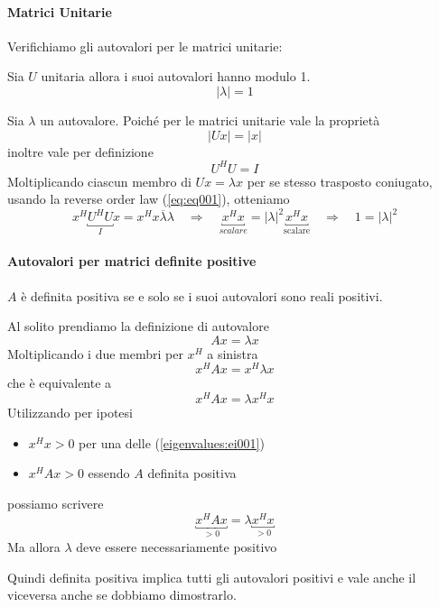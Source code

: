\paragraph{Matrici Unitarie}
Verifichiamo gli autovalori per le matrici unitarie:
\begin{property}
Sia $U$ unitaria allora i suoi autovalori hanno modulo 1.
 $$| \lambda | = 1 $$
\end{property}

\begin{thproof}
Sia $\lambda$ un autovalore. Poich\'e per le matrici unitarie vale la
propriet\`a
$$ |Ux| = |x|$$
inoltre vale per definizione
$$  U^{H} U = I$$
Moltiplicando ciascun membro di $Ux = \lambda x$ per se stesso trasposto
 coniugato, usando la reverse order law ({\ref{eq:eq001})}, otteniamo
$$ x^{H} \underbracket{U^{H} U}_{I}x = x^{H}x \overline{\lambda} \lambda 
\quad 
\Rightarrow 
 \quad \underbracket{x^{H}x}_{scalare} = |\lambda|^2 \underbracket{x^{H}x}_{\text{scalare}}  
 \quad \Rightarrow \quad  1 = | \lambda|^{2}$$
\end{thproof}


\paragraph{Autovalori per matrici definite positive}
\begin{property}
$A$ è definita positiva se e solo se
i suoi autovalori sono reali positivi.
\end{property}

\begin{thproof}
Al solito prendiamo la definizione di autovalore
$$ Ax = \lambda x$$
Moltiplicando i due membri per $x^{H}$ a sinistra
$$ x^{H}Ax = x^{H} \lambda x$$
che \`e equivalente a
$$ x^{H}Ax =  \lambda x^{H}  x$$
Utilizzando per ipotesi
\begin{itemize}
\item $x^{H}x > 0 $ per una delle (\ref{eigenvalues:ei001})
\item $x^{H}Ax > 0$ essendo $A$ definita positiva
\end{itemize}
possiamo scrivere
$$ \underbracket{x^{H}Ax}_{>0} =  \lambda \underbracket{x^{H}x}_{>0}$$
Ma allora $\lambda$ deve essere necessariamente positivo
\end{thproof}

Quindi definita positiva implica tutti gli autovalori positivi e vale
anche il viceversa anche se dobbiamo dimostrarlo.\\

